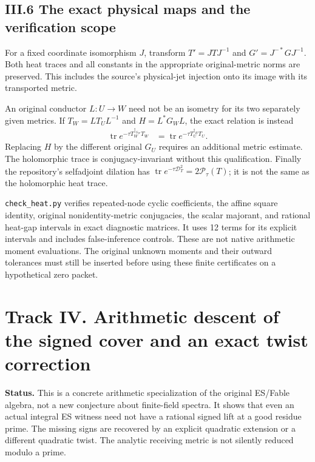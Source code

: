 \subsection{III.6 The exact physical maps and the verification
scope}\label{iii.6-the-exact-physical-maps-and-the-verification-scope}

For a fixed coordinate isomorphism \(J\), transform \(T'=JTJ^{-1}\) and
\(G'=J^{-*}GJ^{-1}\). Both heat traces and all constants in the
appropriate original-metric norms are preserved. This includes the
source's physical-jet injection onto its image with its transported
metric.

An original conductor \(L:U\to W\) need not be an isometry for its two
separately given metrics. If \(T_W=LT_UL^{-1}\) and \(H=L^*G_WL\), the
exact relation is instead \[
\begin{aligned}
\operatorname{tr}e^{-\tau T_W^{\dagger_{G_W}}T_W}
&=\operatorname{tr}e^{-\tau T_U^{\dagger_H}T_U}.
\end{aligned}
\tag{H16}
\] Replacing \(H\) by the different original \(G_U\) requires an
additional metric estimate. The holomorphic trace is conjugacy-invariant
without this qualification. Finally the repository's selfadjoint
dilation has
\(\operatorname{tr}e^{-\tau\mathcal D_T^2}=2\mathcal P_\tau(T)\); it is
not the same as the holomorphic heat trace.

\texttt{check\_heat.py} verifies repeated-node cyclic coefficients, the
affine square identity, original nonidentity-metric conjugacies, the
scalar majorant, and rational heat-gap intervals in exact diagnostic
matrices. It uses 12 terms for its explicit intervals and includes
false-inference controls. These are not native arithmetic moment
evaluations. The original unknown moments and their outward tolerances
must still be inserted before using these finite certificates on a
hypothetical zero packet.

\newpage

\section{Track IV. Arithmetic descent of the signed cover and an exact
twist
correction}\label{track-iv.-arithmetic-descent-of-the-signed-cover-and-an-exact-twist-correction}

\textbf{Status.} This is a concrete arithmetic specialization of the
original ES/Fable algebra, not a new conjecture about finite-field
spectra. It shows that even an actual integral ES witness need not have
a rational signed lift at a good residue prime. The missing signs are
recovered by an explicit quadratic extension or a different quadratic
twist. The analytic receiving metric is not silently reduced modulo a
prime.

